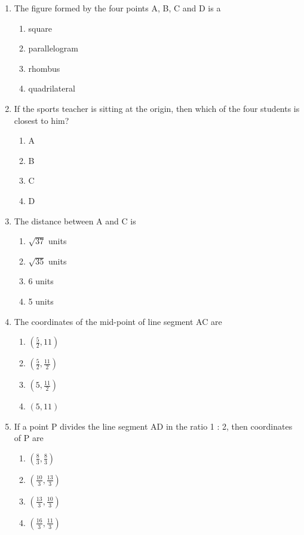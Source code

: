 \documentclass{article}
\begin{document}
\begin{enumerate}
		\begin{enumerate}
			\item  The figure formed by the four points A, B, C and D is a 
			\begin{enumerate}
				\item  square 
				\item  parallelogram
				\item  rhombus 
				\item  quadrilateral 
			\end{enumerate}
			\item If the sports teacher is sitting at the origin, then which of the four students is closest to him? 
			\begin{enumerate}
				\item  A
				\item  B
				\item  C
				\item  D
			\end{enumerate}
			\item The distance between A and C is
			\begin{enumerate}
				\item $\sqrt{37}$ units
				\item $\sqrt{35}$ units
				\item 6 units
				\item 5 units
			\end{enumerate}
			\item The coordinates of the mid-point of line segment AC are
			\begin{enumerate}
				\item $(\frac{5}{2},11)$
				\item $(\frac{5}{2},\frac{11}{2})$
				\item $(5,\frac{11}{2})$
				\item $(5,11)$
			\end{enumerate}
			\item If a point P divides the line segment AD in the ratio 1 : 2, then coordinates of P are
			\begin{enumerate}
				\item $(\frac{8}{3},\frac{8}{3})$
				\item $(\frac{10}{3},\frac{13}{3})$
				\item $(\frac{13}{3},\frac{10}{3})$
				\item $(\frac{16}{3},\frac{11}{3})$
			\end{enumerate}
		\end{enumerate}
		

\end{enumerate}
\end{document}
